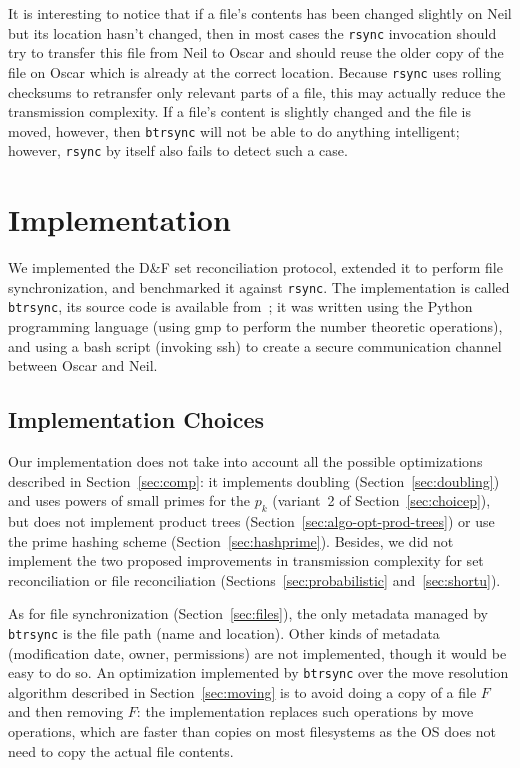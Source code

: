\documentclass[11pt]{llncs}
\newcommand{\df}{D\&F\xspace}
\newcommand{\btrsync}{\texttt{btrsync}\xspace}
\newcommand{\rsync}{\texttt{rsync}\xspace}
\begin{document}
It is interesting to notice that if a file's contents has been changed slightly on Neil but its location hasn't changed, then in most cases the \rsync invocation should try to transfer this file from Neil to Oscar and should reuse the older copy of the file on Oscar which is already at the correct location. Because \rsync uses rolling checksums to retransfer only relevant parts of a file, this may actually reduce the transmission complexity. If a file's content is slightly changed and the file is moved, however, then \btrsync will not be able to do anything intelligent; however, \rsync by itself also fails to detect such a case.

\section{Implementation}
\label{sec:program}

We implemented the \df set reconciliation protocol, extended it to perform file
synchronization, and benchmarked it against \rsync. The implementation is called
\btrsync, its source code is available from~\cite{Robin}; it was written using
the Python programming language (using {\sf gmp} to perform the number theoretic
operations), and using a bash script (invoking ssh) to create a secure communication
channel between Oscar and Neil.

\subsection{Implementation Choices}

Our implementation does not take into account all the possible optimizations
described in Section~\ref{sec:comp}: it implements doubling
(Section~\ref{sec:doubling}) and uses powers of small primes for the $p_k$
(variant~2 of Section~\ref{sec:choicep}), but does not implement product trees
(Section~\ref{sec:algo-opt-prod-trees}) or use the prime hashing scheme
(Section~\ref{sec:hashprime}). Besides, we did not implement the two
proposed improvements in transmission complexity for set reconciliation or file reconciliation 
(Sections~\ref{sec:probabilistic} and~\ref{sec:shortu}).

As for file synchronization (Section~\ref{sec:files}), the only metadata managed by
\btrsync is the file path (name and location). Other kinds of metadata
(modification date, owner, permissions) are not implemented, though it would be
easy to do so. An optimization implemented by \btrsync over the move resolution algorithm described in Section~\ref{sec:moving} is to avoid doing a copy of a file $F$ and then removing $F$: the implementation replaces such operations by move operations, which are faster than copies on most filesystems as the OS does not need to copy the actual file contents.
\end{document}
